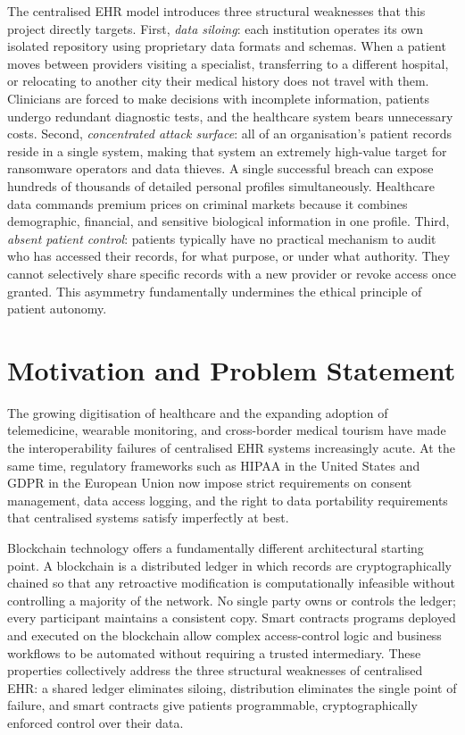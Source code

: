 \documentclass[12pt,a4wide]{report}
\begin{document}
The centralised EHR model introduces three structural weaknesses that this project
directly targets. First, \textit{data siloing}: each institution operates its own
isolated repository using proprietary data formats and schemas. When a patient
moves between providers visiting a specialist, transferring to a different
hospital, or relocating to another city their medical history does not travel
with them. Clinicians are forced to make decisions with incomplete information,
patients undergo redundant diagnostic tests, and the healthcare system bears
unnecessary costs. Second, \textit{concentrated attack surface}: all of an
organisation's patient records reside in a single system, making that system an
extremely high-value target for ransomware operators and data thieves. A single
successful breach can expose hundreds of thousands of detailed personal profiles
simultaneously. Healthcare data commands premium prices on criminal markets because
it combines demographic, financial, and sensitive biological information in one
profile. Third, \textit{absent patient control}: patients typically have no
practical mechanism to audit who has accessed their records, for what purpose, or
under what authority. They cannot selectively share specific records with a new
provider or revoke access once granted. This asymmetry fundamentally undermines
the ethical principle of patient autonomy.

\section{Motivation and Problem Statement}

The growing digitisation of healthcare and the expanding adoption of telemedicine,
wearable monitoring, and cross-border medical tourism have made the interoperability
failures of centralised EHR systems increasingly acute. At the same time, regulatory
frameworks such as HIPAA in the United States and GDPR in the European Union now
impose strict requirements on consent management, data access logging, and the
right to data portability requirements that centralised systems satisfy imperfectly
at best.

Blockchain technology offers a fundamentally different architectural starting point.
A blockchain is a distributed ledger in which records are cryptographically chained
so that any retroactive modification is computationally infeasible without
controlling a majority of the network. No single party owns or controls the ledger;
every participant maintains a consistent copy. Smart contracts programs deployed
and executed on the blockchain allow complex access-control logic and business
workflows to be automated without requiring a trusted intermediary. These properties
collectively address the three structural weaknesses of centralised EHR: a shared
ledger eliminates siloing, distribution eliminates the single point of failure, and
smart contracts give patients programmable, cryptographically enforced control over
their data.
\end{document}
